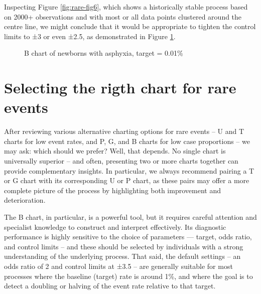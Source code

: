 \documentclass[
]{book}
\makeatletter
\newenvironment{Shaded}{\begin{snugshade}}{\end{snugshade}}
\newcommand{\AttributeTok}[1]{\textcolor[rgb]{0.13,0.29,0.53}{#1}}
\newcommand{\FloatTok}[1]{\textcolor[rgb]{0.00,0.00,0.81}{#1}}
\newcommand{\FunctionTok}[1]{\textcolor[rgb]{0.13,0.29,0.53}{\textbf{#1}}}
\newcommand{\NormalTok}[1]{#1}
\newcommand{\SpecialCharTok}[1]{\textcolor[rgb]{0.81,0.36,0.00}{\textbf{#1}}}
\newcommand*\pandocbounded[1]{%
  \sbox\pandoc@box{#1}%
  \Gscale@div\@tempa{\textheight}{\dimexpr\ht\pandoc@box+\dp\pandoc@box\relax}%
  \Gscale@div\@tempb{\linewidth}{\wd\pandoc@box}%
  \ifdim\@tempb\p@<\@tempa\p@\let\@tempa\@tempb\fi%
  \ifdim\@tempa\p@<\p@\scalebox{\@tempa}{\usebox\pandoc@box}%
  \else\usebox{\pandoc@box}%
  \fi%
}
\makeatother
\begin{document}
Inspecting Figure \ref{fig:rare-fig6}, which shows a historically stable process based on 2000+ observations and with most or all data points clustered around the centre line, we might conclude that it would be appropriate to tighten the control limits to ±3 or even ±2.5, as demonstrated in Figure \ref{fig:rare-fig10}.

\begin{Shaded}
\end{Shaded}

\begin{figure}
\centering
\pandocbounded{}
\caption{\label{fig:rare-fig10}B chart of newborns with asphyxia, target = 0.01\%}
\end{figure}

\section{Selecting the rigth chart for rare events}\label{selecting-the-rigth-chart-for-rare-events}

After reviewing various alternative charting options for rare events -- U and T charts for low event rates, and P, G, and B charts for low case proportions -- we may ask: which should we prefer? Well, that depends. No single chart is universally superior -- and often, presenting two or more charts together can provide complementary insights. In particular, we always recommend pairing a T or G chart with its corresponding U or P chart, as these pairs may offer a more complete picture of the process by highlighting both improvement and deterioration.

The B chart, in particular, is a powerful tool, but it requires careful attention and specialist knowledge to construct and interpret effectively. Its diagnostic performance is highly sensitive to the choice of parameters --- target, odds ratio, and control limits -- and these should be selected by individuals with a strong understanding of the underlying process. That said, the default settings -- an odds ratio of 2 and control limits at ±3.5 -- are generally suitable for most processes where the baseline (target) rate is around 1\%, and where the goal is to detect a doubling or halving of the event rate relative to that target.
\end{document}
